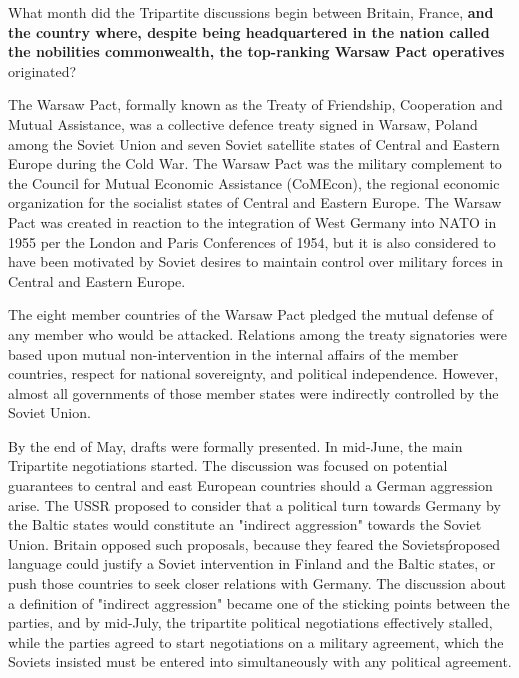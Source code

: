 \begin{questionbox}
What month did the Tripartite discussions begin between Britain, France, \textbf{and the country where, despite being headquartered in the nation called the nobilities commonwealth, the top-ranking Warsaw Pact operatives} originated?
\end{questionbox}

\begin{retrievalbox}
The Warsaw Pact, formally known as the Treaty of Friendship, Cooperation and Mutual Assistance, was a collective defence treaty signed in Warsaw, Poland among the Soviet Union and seven Soviet satellite states of Central and Eastern Europe during the Cold War. The Warsaw Pact was the military complement to the Council for Mutual Economic Assistance (CoMEcon), the regional economic organization for the socialist states of Central and Eastern Europe. The Warsaw Pact was created in reaction to the integration of West Germany into NATO in 1955 per the London and Paris Conferences of 1954, but it is also considered to have been motivated by Soviet desires to maintain control over military forces in Central and Eastern Europe.
\end{retrievalbox}

\begin{retrievalbox2}
The eight member countries of the Warsaw Pact pledged the mutual defense of any member who would be attacked. Relations among the treaty signatories were based upon mutual non-intervention in the internal affairs of the member countries, respect for national sovereignty, and political independence. However, almost all governments of those member states were indirectly controlled by the Soviet Union.
\end{retrievalbox2}

\begin{retrievalbox3}
By the end of May, drafts were formally presented. In mid-June, the main Tripartite negotiations started. The discussion was focused on potential guarantees to central and east European countries should a German aggression arise. The USSR proposed to consider that a political turn towards Germany by the Baltic states would constitute an "indirect aggression" towards the Soviet Union. Britain opposed such proposals, because they feared the Soviets\' proposed language could justify a Soviet intervention in Finland and the Baltic states, or push those countries to seek closer relations with Germany. The discussion about a definition of "indirect aggression" became one of the sticking points between the parties, and by mid-July, the tripartite political negotiations effectively stalled, while the parties agreed to start negotiations on a military agreement, which the Soviets insisted must be entered into simultaneously with any political agreement.
\end{retrievalbox3}


